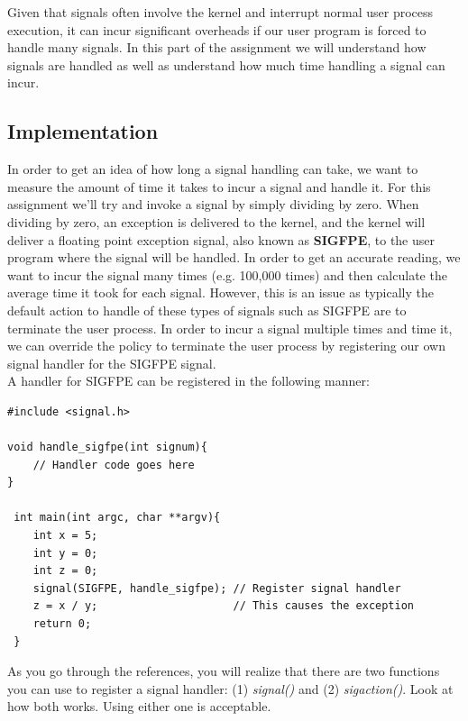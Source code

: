 \documentclass{article}
\begin{document}
Given that signals often involve the kernel and interrupt normal user process execution, it can incur significant overheads if our user program is forced to handle many signals. In this part of the assignment we will understand how signals are handled as well as understand how much time handling a signal can incur. 

\subsection*{Implementation}
In order to get an idea of how long a signal handling can take, we want to measure the amount of time it takes to incur a signal and handle it. For this assignment we'll try and invoke a signal by simply dividing by zero. When dividing by zero, an exception is delivered to the kernel, and the kernel will deliver a floating point exception signal, also known as \textbf{SIGFPE}, to the user program where the signal will be handled. In order to get an accurate reading, we want to incur the signal many times (e.g. 100,000 times) and then calculate the average time it took for each signal. However, this is an issue as typically the default action to handle of these types of signals such as SIGFPE are to terminate the user process. In order to incur a signal multiple times and time it, we can override the policy to terminate the user process by registering our own signal handler for the SIGFPE signal. \\

\noindent A handler for SIGFPE can be registered in the following manner:

\begin{verbatim}
#include <signal.h>
    
void handle_sigfpe(int signum){
    // Handler code goes here
}
    
 int main(int argc, char **argv){
    int x = 5;
    int y = 0;
    int z = 0;
    signal(SIGFPE, handle_sigfpe); // Register signal handler
    z = x / y;                     // This causes the exception
    return 0; 
 }
\end{verbatim}

\begin{info}
As you go through the references, you will realize that there are two functions you can use to register a signal handler: (1) \textit{signal()} and (2) \textit{sigaction()}. Look at how both works. Using either one is acceptable. 
\end{info}
\end{document}
